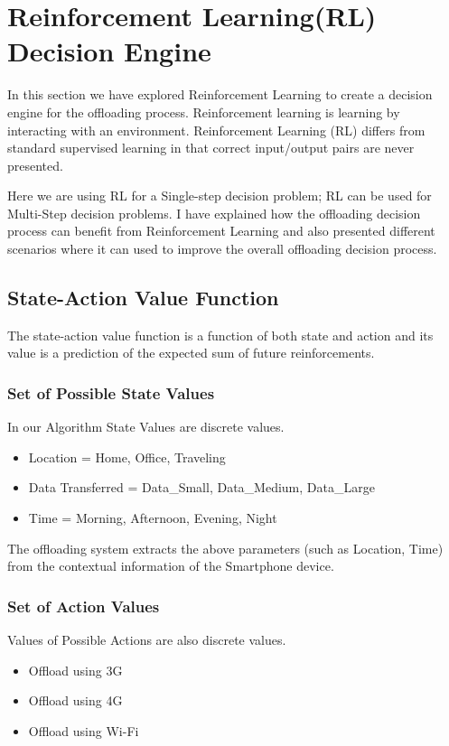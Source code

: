 \documentclass{report}
\begin{document}
\section{Reinforcement Learning(RL) Decision Engine}
In this section we have explored Reinforcement Learning to create a decision engine for the offloading
process. Reinforcement learning is learning by interacting with an environment. Reinforcement Learning
(RL) differs from standard supervised learning in that correct input/output pairs are never presented.

Here we are using RL for a Single-step decision problem; RL can be used for Multi-Step decision problems.
I have explained how the offloading decision process can benefit from Reinforcement Learning and also
presented different scenarios where it can used to improve the overall offloading decision process.

\subsection{State-Action Value Function}
The state-action value function is a function of both state and action and its value is a prediction of the
expected sum of future reinforcements.

\subsubsection{Set of Possible State Values}
In our Algorithm State Values are discrete values.

\begin{itemize}
	
	\item Location = Home, Office, Traveling
	\item Data Transferred = Data\_Small, Data\_Medium, Data\_Large
	\item Time = Morning, Afternoon, Evening, Night
\end{itemize}

The offloading system extracts the above parameters (such as Location, Time) from the contextual information of the Smartphone device.
\subsubsection{Set of Action Values}
Values of Possible Actions are also discrete values.

\begin{itemize}
	\item Offload using 3G
	\item Offload using 4G
	\item Offload using Wi-Fi
\end{itemize}
\end{document}
